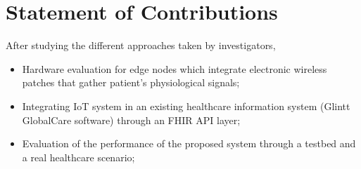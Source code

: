 
\section{Statement of Contributions}


After studying the different approaches taken by investigators, 
\begin{itemize}
    \item Hardware evaluation for edge nodes which integrate electronic wireless patches that gather patient's physiological signals;
    \item Integrating IoT system in an existing healthcare information system (Glintt GlobalCare software) through an FHIR API layer;
    \item Evaluation of the performance of the proposed system through a testbed and a real healthcare scenario;
\end{itemize}
